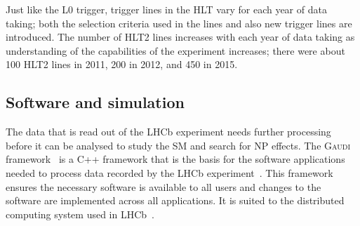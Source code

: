 Just like the L0 trigger, trigger lines in the HLT vary for each year of data taking; both the selection criteria used in the lines and also new trigger lines are introduced. The number of HLT2 lines increases with each year of data taking as understanding of the capabilities of the experiment increases; there were about 100 HLT2 lines in 2011, 200 in 2012, and 450 in 2015. 


\subsection{Software and simulation}
\label{SoftwareSimulation}

The data that is read out of the LHCb experiment needs further processing before it can be analysed to study the SM and search for NP effects. The \textsc{Gaudi} framework~\cite{Mato:1998gfa} is a C++ framework that is the basis for the software applications needed to process data recorded by the LHCb experiment~\cite{Antunes-Nobrega:835156}. This framework ensures the necessary software is available to all users and changes to the software are implemented across all applications. It is suited to the distributed computing system used in LHCb~\cite{Stagni:2012rs}. 


